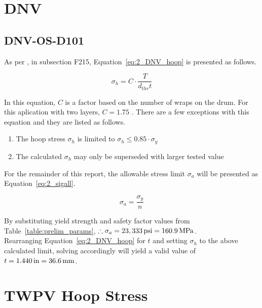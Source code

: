 \section{DNV}

\subsection{DNV-OS-D101}
\label{section:2_DNV}

As per \cite{DNVOSD101}, in subsection F215, Equation~\ref{eq:2_DNV_hoop} is presented as follows.

\begin{equation}
	\label{eq:2_DNV_hoop}
	\sigma_h = C\cdot\frac{T}{d_{thr}t}
\end{equation}

In this equation, $C$ is a factor based on the number of wraps on the drum. For this aplication with two layers, $C=1.75$ \cite{DNVOSD101}. There are a few exceptions with this equation and they are listed as follows.

\begin{enumerate}
	\item The hoop stress $\sigma_h$ is limited to $\sigma_h \leq 0.85\cdot \sigma_y$
	\item The calculated $\sigma_h$  may only be superseded with larger tested value\\
\end{enumerate}

For the remainder of this report, the allowable stress limit $\sigma_a$ will be presented as Equation~\ref{eq:2_sigall}.

\begin{equation}
	\label{eq:2_sigall}
	\sigma_a = \frac{\sigma_y}{n}
\end{equation}

By substituting yield strength and safety factor values from Table~\ref{table:prelim_params}, $\therefore \sigma_a= 23,333 \,\mathrm{psi}= 160.9 \,\mathrm{MPa}$.\\

Rearranging Equation~\ref{eq:2_DNV_hoop} for $t$ and setting $\sigma_h$ to the above calculated limit, solving accordingly will yield a valid value of $t = 1.440 \,\mathrm{in} = 36.6\,\mathrm{mm}$. 

\section{TWPV Hoop Stress}
\label{section:2_TWPV}

